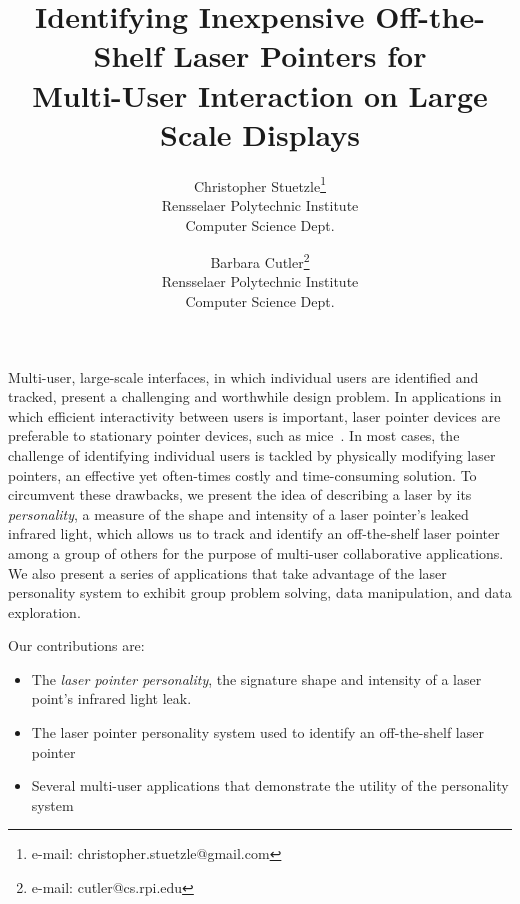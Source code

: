 \documentclass[review]{vgtc}                 %
\title{Identifying Inexpensive Off-the-Shelf Laser Pointers for \\ Multi-User Interaction on Large Scale Displays}
\author{Christopher Stuetzle\thanks{e-mail: christopher.stuetzle@gmail.com}\\ Rensselaer Polytechnic Institute \\ Computer Science Dept. %
\and Barbara Cutler\thanks{e-mail: cutler@cs.rpi.edu}\\ Rensselaer Polytechnic Institute \\ Computer Science Dept. %
}
\begin{document}


\maketitle

Multi-user, large-scale interfaces, in which individual users are
identified and tracked, present a challenging and worthwhile design
problem. In applications in which efficient interactivity between
users is important, laser pointer devices are preferable to stationary
pointer devices, such as
mice~\cite{Pavlovych:2008:ESC:1462027.1462035}. In most cases, the
challenge of identifying individual users is tackled by physically
modifying laser pointers, an effective yet often-times costly and
time-consuming solution.  To circumvent these drawbacks, we present
the idea of describing a laser by its \emph{personality}, a measure of
the shape and intensity of a laser pointer's leaked infrared light,
which allows us to track and identify an off-the-shelf laser pointer
among a group of others for the purpose of multi-user collaborative
applications.
%
We also present a series of applications that take advantage of the laser
personality system to exhibit group problem solving, data
manipulation, and data exploration. 

Our contributions are: \vspace{-0.1in}

\begin{itemize}

\item The \emph{laser pointer personality}, the signature shape and
  intensity of a laser point's infrared light leak.\vspace{-0.1in}

\item The laser pointer personality system used to identify an
  off-the-shelf laser pointer\vspace{-0.1in}

\item Several multi-user applications that demonstrate the utility of
  the personality system
\end{itemize}
\end{document}
